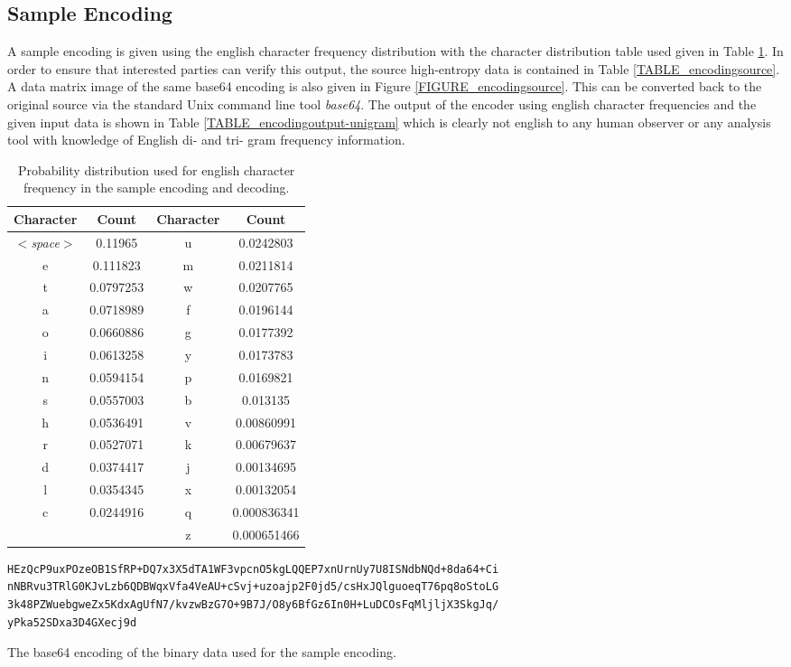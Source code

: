 \documentclass[12pt]{report}
\theoremstyle{remark}
\theoremstyle{definition}
\theoremstyle{definition}
\theoremstyle{definition}
\begin{document}
\begin{appendices}
\section{Sample Encoding} A sample encoding is given using the english character
frequency distribution with the character distribution table used given in Table
\ref{TABLE_unigrams}. In order to ensure that interested parties can verify this
output, the source high-entropy data is contained in Table
\ref{TABLE_encodingsource}. A data matrix image of the same base64 encoding is
also given in Figure \ref{FIGURE_encodingsource}. This can be converted back to
the original source via the standard Unix command line tool \emph{base64}. The
output of the encoder using english character frequencies and the given input
data is shown in Table \ref{TABLE_encodingoutput-unigram} which is clearly not
english to any human observer or any analysis tool with knowledge of English di-
and tri- gram frequency information.

\begin{table}
\centering
\begin{tabular}{ | c | c || c | c | }
Character&Count&Character&Count\\
\hline
$<$\emph{space}$>$&0.11965  &  u&0.0242803\\
e&0.111823 &  m&0.0211814\\
t&0.0797253&  w&0.0207765\\
a&0.0718989&  f&0.0196144\\
o&0.0660886&  g&0.0177392\\
i&0.0613258&  y&0.0173783\\
n&0.0594154&  p&0.0169821\\
s&0.0557003&  b&0.013135\\
h&0.0536491&  v&0.00860991\\
r&0.0527071&  k&0.00679637\\
d&0.0374417&  j&0.00134695\\
l&0.0354345&  x&0.00132054\\
c&0.0244916&  q&0.000836341\\
       &    &  z&0.000651466\\
\end{tabular}
\caption[English character frequency]{Probability distribution used for english character frequency in the sample encoding and decoding.}
\label{TABLE_unigrams}
\end{table}

\begin{table}
\begin{verbatim}
HEzQcP9uxPOzeOB1SfRP+DQ7x3X5dTA1WF3vpcnO5kgLQQEP7xnUrnUy7U8ISNdbNQd+8da64+Ci
nNBRvu3TRlG0KJvLzb6QDBWqxVfa4VeAU+cSvj+uzoajp2F0jd5/csHxJQlguoeqT76pq8oStoLG
3k48PZWuebgweZx5KdxAgUfN7/kvzwBzG7O+9B7J/O8y6BfGz6In0H+LuDCOsFqMljljX3SkgJq/
yPka52SDxa3D4GXecj9d
\end{verbatim}
\caption[Encoding sample - source]{The base64 encoding of the binary data used for the sample encoding.}
\label{TABLE_encodingsource}
\end{table}


\end{appendices}
\end{document}
